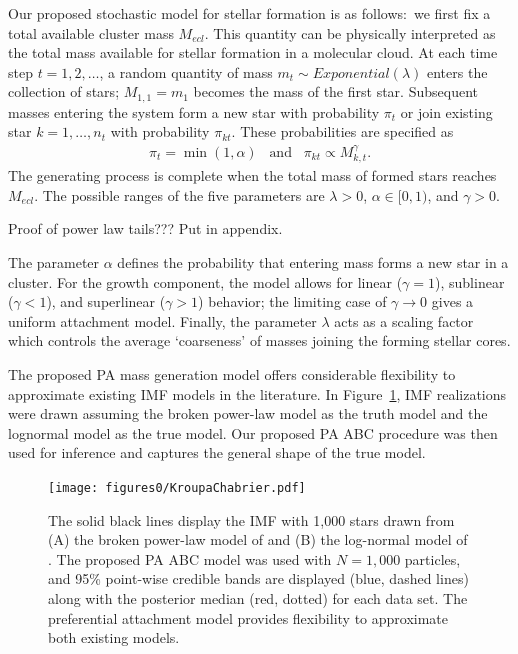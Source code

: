 \documentclass[12pt]{article}
\begin{document}
Our proposed stochastic model for stellar formation is as follows:~we first fix a total available cluster mass $M_{ecl}$. 
This quantity can be physically interpreted as the total mass available for stellar formation in a molecular cloud. 
At each time step $t = 1, 2, \ldots$, a random quantity of mass $m_t \sim Exponential(\lambda)$ enters the collection of stars; $M_{1,1} = m_1$ becomes the mass of the first star.
Subsequent masses entering the system form a new star with probability $\pi_t$ or join existing star $k = 1, \ldots, n_t$ with probability $\pi_{kt}$.
These probabilities are specified as
\begin{align}
	\pi_t = \min \left (1, \alpha \right ) \;\;\; \text{and} \;\;\; \pi_{kt} \propto M_{k,t}^{\gamma}\text{.}
\label{eq:PAstars}
\end{align}
The generating process is complete when the total mass of formed stars reaches $M_{ecl}$. 
The possible ranges of the five parameters are $\lambda > 0$, $\alpha \in [0,1)$, and $\gamma > 0$. 

\begin{center}
{\color{red}
Proof of power law tails???  Put in appendix.
}
\end{center}


The parameter $\alpha$ defines the probability that entering mass forms a new star in a cluster.  For the growth component, the model allows for linear ($\gamma = 1$), sublinear ($\gamma < 1$), and superlinear ($\gamma > 1$) behavior; the limiting case of $\gamma \to 0$ gives a uniform attachment model.  Finally, the parameter $\lambda$ acts as a scaling factor which controls the average `coarseness' of masses joining the forming stellar cores. 

The proposed PA mass generation model offers considerable flexibility to approximate existing IMF models in the literature.  In Figure~\ref{fig:otherModels}, IMF realizations were drawn assuming the \cite{kroupa2001} broken power-law model as the truth model and the \cite{chabrier2005} lognormal model as the true model.  Our proposed PA ABC procedure was then used for inference and captures the general shape of the true model.

\begin{figure} \centering
	\texttt{[image: figures0/KroupaChabrier.pdf]}
	\vspace{-0.1in}
	\caption{The solid black lines display the IMF with 1,000 stars drawn from (A) the broken power-law model of \cite{kroupa2001} and (B) the log-normal model of \cite{chabrier2005}.  The proposed PA ABC model was used with $N = 1,000$ particles, and 95\% point-wise credible bands are displayed (blue, dashed lines) along with the posterior median (red, dotted) for each data set.  The preferential attachment model provides flexibility to approximate both existing models.
	}
	\label{fig:otherModels}
\end{figure}
\end{document}
